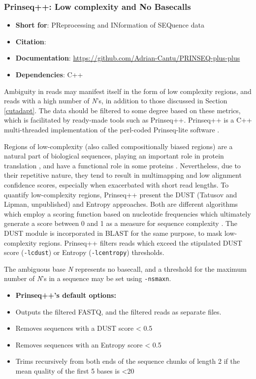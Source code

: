 \subsubsection{Prinseq++: Low complexity and No Basecalls}
\begin{itemize}\itemsep-0.5em
\item[] \textbf{Short for}: 				PReprocessing and INformation of SEQuence data
\item[] \textbf{Citation}: 				\cite{prinseq++}
\item[] \textbf{Documentation}: 	\url{https://github.com/Adrian-Cantu/PRINSEQ-plus-plus}
\item[] \textbf{Dependencies}: C++
\end{itemize}
Ambiguity in reads may manifest itself in the form of low complexity regions, and reads with a high number of \textit{N}'s, in addition to those discussed in Section \ref{cutadapt}. The data should be filtered to some degree based on these metrics, which is facilitated by ready-made tools such as Prinseq++. Prinseq++ is a C++ multi-threaded implementation of the perl-coded Prinseq-lite software \citep{schmieder2011quality}. 

Regions of low-complexity (also called compositionally biased regions) are a natural part of biological sequences, playing an important role in protein translation \citep{frugier2010low}, and have a functional role in some proteins \citep{ntountoumi2019low}. Nevertheless, due to their repetitive nature, they tend to result in multimapping and low alignment confidence scores, especially when exacerbated with short read lengths. To quantify low-complexity regions, Prinseq++ present the DUST (Tatusov and Lipman, unpublished) and Entropy approaches. Both are different algorithms which employ a scoring function based on nucleotide frequencies which ultimately generate a score between 0 and 1 as a measure for sequence complexity  \citep{morgulis2006fast}. The DUST module is incorporated in BLAST \citep{altschul1997gapped} for the same purpose, to mask low-complexity regions. Prinseq++ filters reads which exceed the stipulated DUST score (\texttt{-lc\textunderscore dust}) or Entropy (\texttt{-lc\textunderscore entropy}) thresholds.

The ambiguous base \textit{N} represents no basecall, and a threshold for the maximum number of \textit{N}'s in a sequence may be set using \texttt{-ns\textunderscore max\textunderscore n}.
    
\begin{itemize}\itemsep0em
\item[]\textbf{Prinseq++'s default options:}
\item Outputs the filtered FASTQ, and the filtered reads as separate files.
\item Removes sequences with a DUST score < 0.5
\item Removes sequences with an Entropy score < 0.5 
\item Trims recursively from both ends of the sequence chunks of length 2 if the mean quality of the first 5 bases is <20 
\end{itemize}

